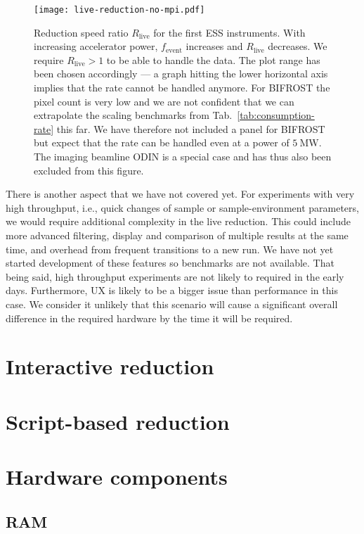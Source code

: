 \documentclass[a4paper,english,numbers=noenddot,bibliography=totoc,chapterprefix=on,DIV=12]{scrartcl}
\newcommand{\Fevent}{f_{\text{event}}}
\newcommand{\bifrost}{BIFROST\xspace}
\newcommand{\odin}{ODIN\xspace}
\begin{document}
\begin{figure}
  \centering
\texttt{[image: live-reduction-no-mpi.pdf]}
\caption{\label{fig:live-reduction-no-mpi}Reduction speed ratio $R_{\text{live}}$ for the first ESS instruments.
With increasing accelerator power, $\Fevent$ increases and $R_{\text{live}}$ decreases.
We require $R_{\text{live}} > 1$ to be able to handle the data.
The plot range has been chosen accordingly --- a graph hitting the lower horizontal axis implies that the rate cannot be handled anymore.
For \bifrost the pixel count is very low and we are not confident that we can extrapolate the scaling benchmarks from Tab.~\ref{tab:consumption-rate} this far.
We have therefore not included a panel for \bifrost but expect that the rate can be handled even at a power of $5~\mathrm{MW}$.
The imaging beamline \odin is a special case and has thus also been excluded from this figure.
}
\end{figure}

There is another aspect that we have not covered yet.
For experiments with very high throughput, i.e., quick changes of sample or sample-environment parameters, we would require additional complexity in the live reduction.
This could include more advanced filtering, display and comparison of multiple results at the same time, and overhead from frequent transitions to a new run.
We have not yet started development of these features so benchmarks are not available.
That being said, high throughput experiments are not likely to required in the early days.
Furthermore, UX is likely to be a bigger issue than performance in this case.
We consider it unlikely that this scenario will cause a significant overall difference in the required hardware by the time it will be required.

\section{Interactive reduction}
\section{Script-based reduction}



\section{Hardware components}

\subsection{RAM}
\end{document}
